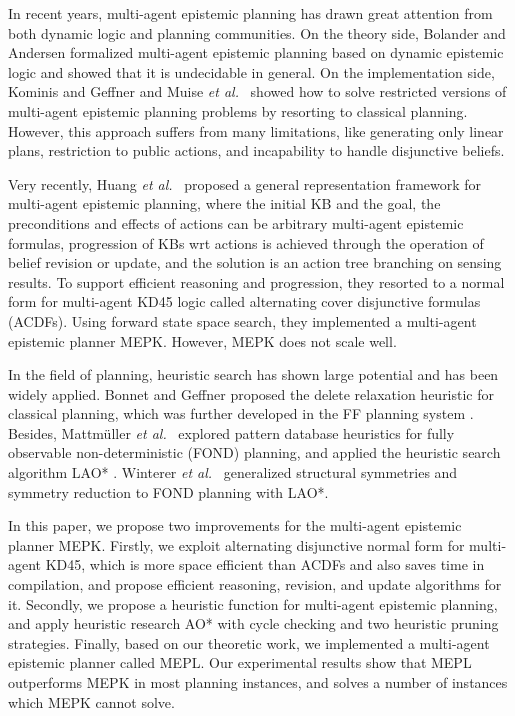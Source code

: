 \documentclass{llncs}
\newcommand\etc{{\it et al.}}
\begin{document}
In recent years, multi-agent epistemic planning has drawn great attention from both dynamic logic and planning communities. On the theory side, Bolander and Andersen \cite{bolander2011epistemic} formalized multi-agent epistemic planning based on dynamic epistemic logic \cite{van2007dynamic} and showed that it is undecidable in general. On the implementation side, Kominis and Geffner \cite{kominis2015beliefs} and Muise \etc\ \cite{muise2015planning} showed how to solve restricted versions of multi-agent epistemic planning problems by resorting to classical planning. However, this approach suffers from many limitations, like generating only linear plans, restriction to public actions, and incapability to handle disjunctive beliefs.

Very recently, Huang \etc\ \cite{Liu2017A} proposed a general representation framework for multi-agent epistemic planning, where the initial KB and the goal, the preconditions and effects of actions can be
arbitrary multi-agent epistemic formulas, progression of KBs wrt actions is achieved through the operation of belief revision or update, and the solution is an action tree branching on sensing results.
To support efficient reasoning and progression, they resorted to a
normal form for multi-agent KD45 logic called alternating cover disjunctive formulas (ACDFs). Using forward state space search, they implemented a multi-agent epistemic planner MEPK. However, MEPK does not scale well.


In the field of planning, heuristic search has shown large potential and has been widely applied. Bonnet and Geffner \cite{bonnet1998hsp} proposed the delete relaxation heuristic for classical planning, which was further developed in the FF planning system \cite{Hoffman2011Fast}. Besides, Mattm{\"{u}}ller \etc\ \cite{Mattm2010Pattern} explored pattern database heuristics for fully observable non-deterministic (FOND) planning, and applied the heuristic search algorithm LAO* \cite{Hansen2001LAO}.
 Winterer \etc\ \cite{Winterer2016Structural} generalized
structural symmetries and
symmetry reduction to FOND planning with LAO*.

In this paper, we propose two improvements for the multi-agent epistemic planner MEPK. Firstly, we exploit alternating disjunctive normal form for multi-agent KD45, which is more space efficient than ACDFs and also saves time in compilation, and propose efficient reasoning, revision, and update algorithms for it. Secondly, we propose a heuristic function for multi-agent epistemic planning, and apply heuristic research AO* with cycle checking and two heuristic pruning strategies.
Finally, based on our theoretic work, we implemented a multi-agent epistemic planner called MEPL. Our experimental results show that MEPL outperforms MEPK in most planning instances, and solves a number of instances which MEPK cannot solve.
\end{document}
